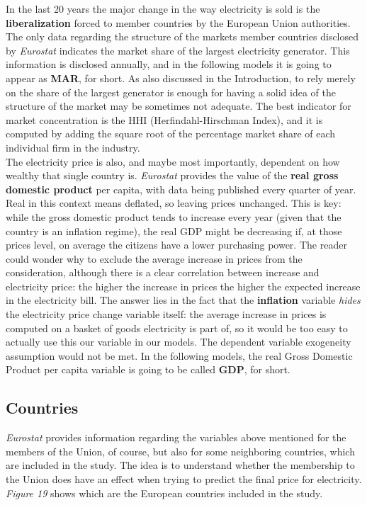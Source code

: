 \documentclass{book}
\begin{document}
\noindent In the last 20 years the major change in the way electricity is sold is the \textbf{liberalization} forced to member countries by the European Union authorities. The only data regarding the structure of the markets member countries disclosed by \textit{Eurostat} indicates the market share of the largest electricity generator. This information is disclosed annually, and in the following models it is going to appear as \textbf{MAR}, for short. As also discussed in the Introduction, to rely merely on the share of the largest generator is enough for having a solid idea of the structure of the market may be sometimes not adequate. The best indicator for market concentration is the HHI (Herfindahl-Hirschman Index), and it is computed by adding the square root of the percentage market share of each individual firm in the industry.\\

\noindent The electricity price is also, and maybe most importantly, dependent on how wealthy that single country is. \textit{Eurostat} provides the value of the \textbf{real gross domestic product} per capita, with data being published every quarter of year. Real in this context means deflated, so leaving prices unchanged. This is key: while the gross domestic product tends to increase every year (given that the country is an inflation regime), the real GDP might be decreasing if, at those prices level, on average the citizens have a lower purchasing power. The reader could wonder why to exclude the average increase in prices from the consideration, although there is a clear correlation between increase and electricity price: the higher the increase in prices the higher the expected increase in the electricity bill. The answer lies in the fact that the \textbf{inflation} variable \textit{hides} the electricity price change variable itself: the average increase in prices is computed on a basket of goods electricity is part of, so it would be too easy to actually use this our variable in our models. The dependent variable exogeneity assumption would not be met. In the following models, the real Gross Domestic Product per capita variable is going to be called \textbf{GDP}, for short.

\subsection{Countries}

\textit{Eurostat} provides information regarding the variables above mentioned for the members of the Union, of course, but also for some neighboring countries, which are included in the study. The idea is to understand whether the membership to the Union does have an effect when trying to predict the final price for electricity. \textit{Figure 19} shows which are the European countries included in the study.
\end{document}
